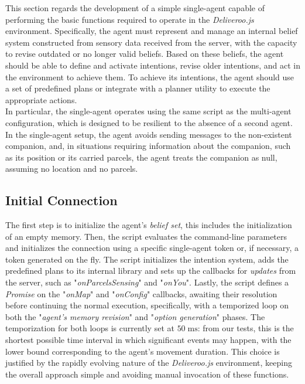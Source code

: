     This section regards the development of a simple single-agent capable of performing the basic functions required to operate in the \textit{Deliveroo.js} environment. Specifically, the agent must represent and manage an internal belief system constructed from sensory data received from the server, with the capacity to revise outdated or no longer valid beliefs. Based on these beliefs, the agent should be able to define and activate intentions, revise older intentions, and act in the environment to achieve them. To achieve its intentions, the agent should use a set of predefined plans or integrate with a planner utility to execute the appropriate actions.
    \medskip\\    
    In particular, the single-agent operates using the same script as the multi-agent configuration, which is designed to be resilient to the absence of a second agent. In the single-agent setup, the agent avoids sending messages to the non-existent companion, and, in situations requiring information about the companion, such as its position or its carried parcels, the agent treats the companion as null, assuming no location and no parcels.

    \subsection{Initial Connection}
        The first step is to initialize the agent's \textit{belief set}, this includes the initialization of an empty memory. Then, the script evaluates the command-line parameters and initializes the connection using a specific single-agent token or, if necessary, a token generated on the fly. The script initializes the intention system, adds the predefined plans to its internal library and sets up the callbacks for \textit{updates} from the server, such as "\textit{onParcelsSensing}" and "\textit{onYou}". Lastly, the script defines a \textit{Promise} on the "\textit{onMap}" and "\textit{onConfig}" callbacks, awaiting their resolution before continuing the normal execution, specifically, with a temporized loop on both the "\textit{agent's memory revision}" and "\textit{option generation}" phases. The temporization for both loops is currently set at $50\;\text{ms}$: from our tests, this is the shortest possible time interval in which significant events may happen, with the lower bound corresponding to the agent's movement duration. This choice is justified by the rapidly evolving nature of the \textit{Deliveroo.js} environment, keeping the overall approach simple and avoiding manual invocation of these functions.

